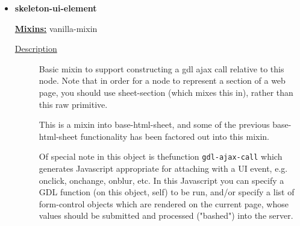 \documentclass [11pt]{book}
\begin{document}
\begin{itemize}







\item {}
\label{prim:skeleton-ui-element}
\textbf{skeleton-ui-element}


\textbf{
\underline{Mixins:}} vanilla-mixin





\begin{description}

\item [
\underline{Description}]


Basic mixin to support constructing a gdl ajax call 
relative to this node. Note that in order for a node to represent a section of a 
web page, you should use sheet-section (which mixes this in), rather than this raw 
primitive. 

This is a mixin into base-html-sheet, and some of the previous base-html-sheet 
functionality has been factored out into this mixin. 

Of special note in this object is thefunction \texttt{gdl-ajax-call} which generates 
Javascript appropriate for attaching with a UI event, e.g. onclick, onchange, 
onblur, etc. In this Javascript you can specify a GDL function (on this object, self) 
to be run, and/or specify a list of form-control objects which are rendered on 
the current page, whose values should be submitted and processed ("bashed") into the 
server.



\end{description}





\end{itemize}
\end{document}

